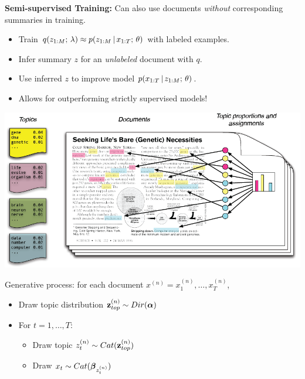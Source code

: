 \begin{frame}
\textbf{Semi-supervised Training:} Can also use documents \textit{without} corresponding summaries in training.
\begin{itemize}
    \item Train $q(z_{1:M} ; \, \lambda) \approx p(z_{1:M} \,|\, x_{1:T} ; \, \theta)$ with labeled examples.
    \air
    \item Infer summary $z$ for an \textit{unlabeled} document with $q$.
    \air
    \item Use inferred $z$ to improve model $p(x_{1:T} \,|\, z_{1:M} ; \, \theta)$.
    \air
    \item Allows for outperforming strictly supervised models!
\end{itemize}
\end{frame}


\begin{frame}

\begin{center}
\includegraphics[scale=0.27]{pics/IntroToLDA.png}
\end{center}

Generative process: for each document $x^{(n)} = x^{(n)}_1, \ldots, x^{(n)}_T$,

\vspace{-2mm}
\begin{itemize}
    \item  Draw topic distribution $\mathbf{z}^{(n)}_{top} \sim Dir(\boldsymbol{\alpha})$
    \item  For $t=1, \ldots, T$:
    \begin{itemize}
        \item Draw topic $z^{(n)}_t \sim Cat(\mathbf{z}^{(n)}_{top})$
        \item Draw $x_t \sim Cat(\boldsymbol{\beta}_{z^{(n)}_t})$
    \end{itemize}
\end{itemize}
    
\end{frame}

